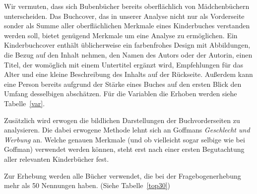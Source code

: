     Wir vermuten, dass sich Bubenbücher bereits oberflächlich von Mädchenbüchern
    unterscheiden. Das Buchcover, das in unserer Analyse nicht nur als
    Vorderseite sonder als Summe aller oberflächlichen Merkmale eines
    Kinderbuches verstanden werden soll, bietet genügend Merkmale um eine
    Analyse zu ermöglichen. Ein Kinderbuchcover enthält üblicherweise ein
    farbenfrohes Design mit Abbildungen, die Bezug auf den Inhalt nehmen, den
    Namen des Autors oder der Autorin, einen Titel, der womöglich mit einem
    Untertitel ergänzt wird, Empfehlungen für das Alter und eine kleine
    Beschreibung des Inhalts auf der Rückseite. Außerdem kann eine Person
    bereits aufgrund der Stärke eines Buches auf den ersten Blick den Umfang
    desselbigen abschätzen. Für die Variablen die Erhoben werden siehe
    Tabelle~\ref{var}.



    Zusätzlich wird erwogen die bildlichen Darstellungen der Buchvorderseiten zu
    analysieren. Die dabei erwogene Methode lehnt sich an Goffmans
    \emph{Geschlecht und Werbung} an. Welche genauen Merkmale (und ob vielleicht
    sogar selbige wie bei Goffman) verwendet werden können, steht erst nach
    einer ersten Begutachtung aller relevanten Kinderbücher fest.

    Zur Erhebung werden alle Bücher verwendet, die bei der Fragebogenerhebung
    mehr als 50 Nennungen haben. (Siehe Tabelle~\ref{top30})

      
